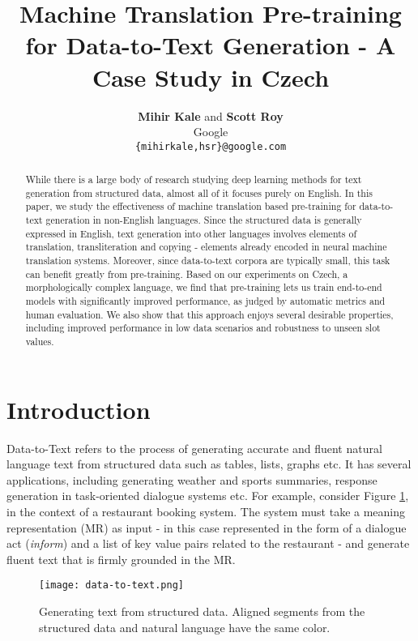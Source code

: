 \documentclass[11pt,a4paper]{article}
\title{\textbf{Machine Translation Pre-training for Data-to-Text Generation - A Case Study in Czech}}
\author{\textbf{Mihir Kale} and \textbf{Scott Roy} \\
  Google \\
  \texttt{\{mihirkale,hsr\}@google.com}}
\date{}
\begin{document}
\maketitle
\begin{abstract}
While there is a large body of research studying deep learning methods for text generation from structured data, almost all of it focuses purely on English. In this paper, we study the effectiveness of machine translation based pre-training for data-to-text generation in non-English languages. Since the structured data is generally expressed in English, text generation into other languages involves elements of translation, transliteration and copying - elements already encoded in neural machine translation systems. Moreover, since data-to-text corpora are typically small, this task can benefit greatly from pre-training. Based on our experiments on Czech, a morphologically complex language, we find that pre-training lets us train end-to-end models with significantly improved performance, as judged by automatic metrics and human evaluation. We also show that this approach enjoys several desirable properties, including improved performance in low data scenarios and robustness to unseen slot values. 
\end{abstract}


\section{Introduction}
Data-to-Text refers to the process of generating accurate and fluent natural language text from structured data such as tables, lists, graphs etc.\citep{gatt2018survey}
It has several applications, including generating weather and sports summaries, response generation in task-oriented dialogue systems etc. For example, consider Figure \ref{fig:data-to-text}, in the context of a restaurant booking system. The system must take a meaning representation (MR) as input - in this case represented in the form of a dialogue act (\textsl{inform}) and a list of key value pairs related to the restaurant - and generate fluent text that is firmly grounded in the MR. \par


\begin{figure}
\noindent\texttt{[image: data-to-text.png]}
\caption{
Generating text from structured data. Aligned segments from the structured data and natural language have the same color.
}
\label{fig:data-to-text}
\end{figure} 
\end{document}
